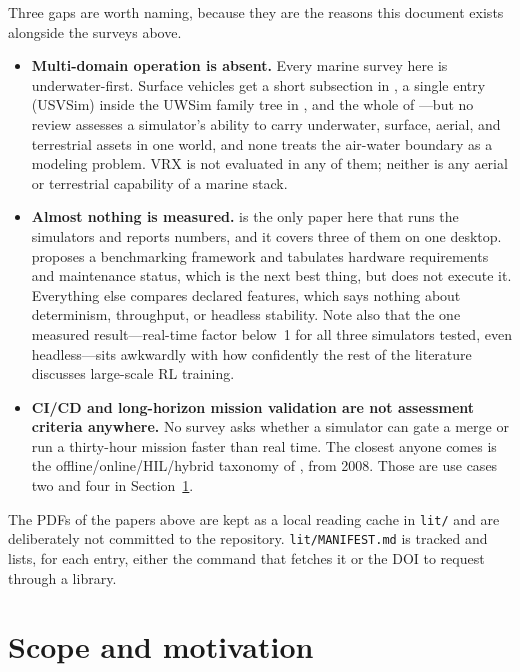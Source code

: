 \documentclass[11pt]{article}
\begin{document}
Three gaps are worth naming, because they are the reasons this document exists alongside the surveys above.

\begin{itemize}[leftmargin=*]
  \item \textbf{Multi-domain operation is absent.} Every marine survey here is underwater-first. Surface vehicles get a short subsection in \textcite{collins2021physicssim}, a single entry (USVSim) inside the UWSim family tree in \textcite{shaw2026simplatforms}, and the whole of \textcite{sawada2024marinesim}---but no review assesses a simulator's ability to carry underwater, surface, aerial, and terrestrial assets in one world, and none treats the air-water boundary as a modeling problem. VRX is not evaluated in any of them; neither is any aerial or terrestrial capability of a marine stack.
  \item \textbf{Almost nothing is measured.} \textcite{huang2024urobench} is the only paper here that runs the simulators and reports numbers, and it covers three of them on one desktop. \textcite{shaw2026simplatforms} proposes a benchmarking framework and tabulates hardware requirements and maintenance status, which is the next best thing, but does not execute it. Everything else compares declared features, which says nothing about determinism, throughput, or headless stability. Note also that the one measured result---real-time factor below~1 for all three simulators tested, even headless---sits awkwardly with how confidently the rest of the literature discusses large-scale RL training.
  \item \textbf{CI/CD and long-horizon mission validation are not assessment criteria anywhere.} No survey asks whether a simulator can gate a merge or run a thirty-hour mission faster than real time. The closest anyone comes is the offline/online/HIL/hybrid taxonomy of \textcite{matsebe2008review}, from 2008. Those are use cases two and four in Section~\ref{sec:scope}.
\end{itemize}

The PDFs of the papers above are kept as a local reading cache in \texttt{lit/} and are deliberately not committed to the repository. \texttt{lit/MANIFEST.md} is tracked and lists, for each entry, either the command that fetches it or the DOI to request through a library.

\section{Scope and motivation}
\label{sec:scope}
\end{document}
